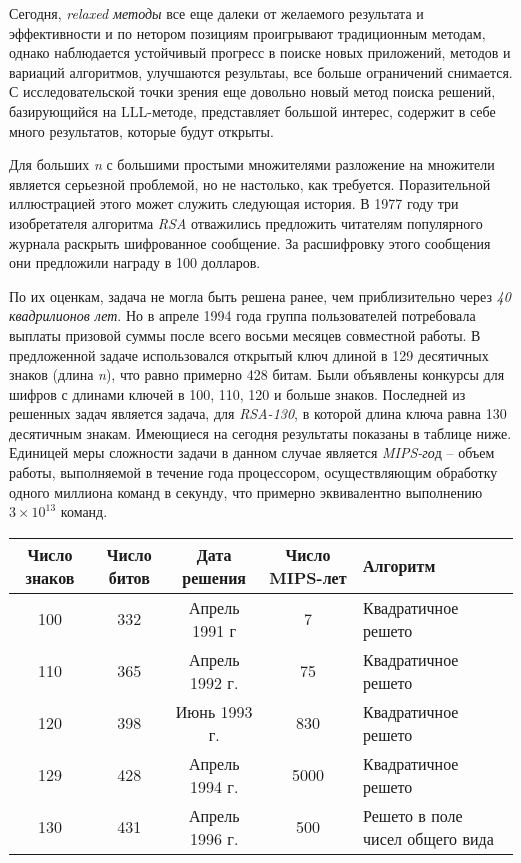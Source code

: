   Сегодня, \textit{relaxed методы} все еще далеки от желаемого результата и эффективности и по нетором позициям проигрывают традиционным методам,
  однако наблюдается устойчивый прогресс в поиске новых приложений, методов и вариаций алгоритмов, улучшаются результаы, все больше ограничений
  снимается. С исследовательской точки зрения еще довольно новый метод поиска решений, базирующийся на LLL-методе, представляет большой интерес,
  содержит в себе много результатов, которые будут открыты.
  
  Для больших \textit{n} с большими простыми множителями разложение на множители является серьезной проблемой, но не настолько, как требуется. 
  Поразительной иллюстрацией этого может служить следующая история. В 1977 году три изобретателя алгоритма
\textit{RSA} отважились предложить читателям 
  популярного журнала раскрыть шифрованное сообщение. За расшифровку этого сообщения они предложили
награду в 100 долларов.
  
  По их оценкам, задача не могла быть решена ранее, чем приблизительно через \textit{40 квадрилионов лет}. Но в апреле 1994 года группа пользователей 
  потребовала выплаты
призовой суммы после всего восьми месяцев совместной работы. В предложенной задаче использовался открытый ключ длиной в
  129 десятичных знаков (длина \textit{n}), что
равно примерно 428 битам. Были объявлены конкурсы для шифров с длинами ключей в 100, 110, 120
  и больше знаков. Последней из
решенных задач является задача, для \textit{RSA-130}, в которой длина ключа 
  равна 130 десятичным знакам. Имеющиеся на сегодня результаты показаны в таблице ниже. Единицей меры
сложности задачи в данном случае является \textit{MIPS-го}д – 
  объем работы, выполняемой в
течение года процессором, осуществляющим обработку одного миллиона команд в секунду, что примерно эквивалентно 
  выполнению {$3\times10^13$} команд.
  
  \begin{table}[ht]
    \begin{tabular}{@{}ccccp{4.5cm}@{}}
    \toprule
    \textbf{Число знаков} & \textbf{Число битов} & \textbf{Дата решения} & \textbf{Число MIPS-лет} & \textbf{Алгоритм} \\ \midrule
    100                              & 332                  & Апрель 1991 г         & 7                       & Квадратичное решето              \\
    110                              & 365                  & Апрель 1992 г.        & 75                      & Квадратичное решето              \\
    120                              & 398                  & Июнь 1993 г.          & 830                     & Квадратичное решето              \\
    129                              & 428                  & Апрель 1994 г.        & 5000                    & Квадратичное решето              \\
    130                              & 431                  & Апрель 1996 г.        & 500                     & Решето в поле чисел общего вида  \\ \bottomrule
    \end{tabular}
  \end{table}
  
